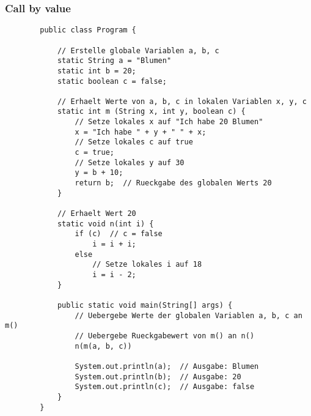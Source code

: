 \documentclass{article}
\begin{document}
    \subsubsection*{Call by value}
    \begin{lstlisting}
        public class Program {
            
            // Erstelle globale Variablen a, b, c
            static String a = "Blumen"
            static int b = 20;
            static boolean c = false;

            // Erhaelt Werte von a, b, c in lokalen Variablen x, y, c
            static int m (String x, int y, boolean c) {  
                // Setze lokales x auf "Ich habe 20 Blumen"
                x = "Ich habe " + y + " " + x; 
                // Setze lokales c auf true
                c = true;
                // Setze lokales y auf 30
                y = b + 10;
                return b;  // Rueckgabe des globalen Werts 20
            }

            // Erhaelt Wert 20
            static void n(int i) {
                if (c)  // c = false 
                    i = i + i;  
                else
                    // Setze lokales i auf 18
                    i = i - 2;
            }

            public static void main(String[] args) {
                // Uebergebe Werte der globalen Variablen a, b, c an m()
                // Uebergebe Rueckgabewert von m() an n()
                n(m(a, b, c))  

                System.out.println(a);  // Ausgabe: Blumen
                System.out.println(b);  // Ausgabe: 20
                System.out.println(c);  // Ausgabe: false
            }
        }
    \end{lstlisting}
\end{document}
